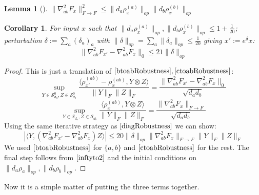 \documentclass{article}
\newtheorem{corollary}[theorem]{Corollary}
\newtheorem{lemma}[theorem]{Lemma}
\newcommand\Sym{\mathcal{S}}
\newcommand\samp{x}
\newcommand{\AR}[1]{{\color{orange}[AR: #1]}}
\begin{document}
\begin{lemma}[\cite{KLR19}] \label{inftyto2}
$\|\nabla^{2}_{ab} F_{\samp}\|_{F \to F}^{2} \leq \|d_{a} \rho_{\samp}^{(a)}\|_{op} \|d_{b} \rho_{\samp}^{(b)}\|_{op}$
\end{lemma}

\begin{corollary} \label{offdiagRobustness}
For input $\samp$ such that $\|d_{a} \rho_{\samp}^{(a)}\|_{op}, \|d_{b} \rho_{\samp}^{(b)}\|_{op} \leq 1+\frac{1}{20}$; perturbation $\delta := \sum_{a} (\delta_{a})_{a}$ with $\|\delta\|_{op} = \sum_{a} \|\delta_{a}\|_{op} \leq \frac{1}{20}$ giving $\samp' := e^{\delta} \samp$:
\[ \|\nabla^{2}_{ab} F_{\samp'} - \nabla^{2}_{ab} F_{\samp}\|_{0} \leq 21 \|\delta\|_{op}  \]
\end{corollary}
\begin{proof}
This is just a translation of $\ref{btoabRobustness},\ref{ctoabRobustness}$:
\[ \sup_{Y \in \Sym_{d_{a}}^{0}, Z \in \Sym_{d_{b}}^{0}} \frac{\langle \rho_{\samp'}^{(ab)} - \rho_{\samp}^{(ab)}, Y \otimes Z \rangle}{\|Y\|_{F} \|Z\|_{F}} = \frac{\|\nabla^{2}_{ab} F_{\samp'} - \nabla^{2}_{ab} F_{\samp}\|_{0}}{\sqrt{d_{a} d_{b}} } \]
\[ \sup_{Y \in \Sym_{d_{a}}, Z \in \Sym_{d_{b}}} \frac{\langle \rho_{\samp}^{(ab)}, Y \otimes Z \rangle}{\|Y\|_{F} \|Z\|_{F}} = \frac{\|\nabla^{2}_{ab} F_{\samp}\|_{F \to F}}{\sqrt{d_{a} d_{b}} }       \]
Using the same iterative strategy as $\ref{diagRobustness}$ we can show: 
\[ |\langle Y, (\nabla^{2}_{ab} F_{\samp'} - \nabla^{2}_{ab} F_{\samp}) Z \rangle| \leq 20 \|\delta\|_{op} \|\nabla^{2}_{ab} F_{\samp}\|_{F \to F} \|Y\|_{F} \|Z\|_{F}    \]
We used $\ref{btoabRobustness}$ for $\{a,b\}$ and $\ref{ctoabRobustness}$ for the rest. The final step follows from $\ref{inftyto2}$ and the initial conditions on $\|d_{a} \rho_{a}\|_{op}, \|d_{b} \rho_{b}\|_{op}$. 
\end{proof}

Now it is a simple matter of putting the three terms together. 
\end{document}
